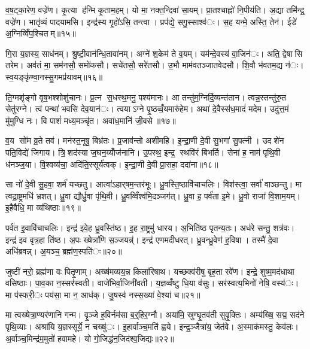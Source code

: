 व॒ष॒ट्का॒रेण॒ वज्रे॑ण। कृ॒त्या ह॑न्मि कृ॒ताम॒हम्। यो मा॒ नक्त॒न्दिवा॑ सा॒यम्। प्रा॒तश्चाह्नो॑ नि॒पीय॑ति। अ॒द्या तमि॑न्द्र॒ वज्रे॑ण। भातृ॑व्यं पादयामसि। इन्द्र॑स्य गृ॒हो॑ऽसि॒ तन्त्वा। प्रप॑द्ये॒ सगु॒स्साश्व॑ः। स॒ह यन्मे॒ अस्ति॒ तेन॑। ईडे॑ अ॒ग्निव्विँ॑प॒श्चितम्॥१५॥

गि॒रा य॒ज्ञस्य॒ साध॑नम्। श्रु॒ष्टी॒वान॑न्धि॒तावा॑नम्। अग्ने॑ श॒केम॑ ते व॒यम्। यम॑न्दे॒वस्य॑ वा॒जिन॑ः। अति॒ द्वेषासि तरेम। अव॑तं मा॒ सम॑नसौ॒ समो॑कसौ। सचे॑तसौ॒ सरे॑तसौ। उ॒भौ माम॑वतञ्जातवेदसौ। शि॒वौ भ॑वतम॒द्य न॑ः। स्व॒यङ्कृ॑ण्वा॒नस्सु॒गमप्र॑यावम्॥१६॥

ति॒ग्मशृ॑ङ्गो वृष॒भश्शोशु॑चानः। प्र॒त्न स॒धस्थ॒मनु॒ पश्य॑मानः। आ तन्तु॑म॒ग्निर्दि॒व्यन्त॑तान। त्वन्न॒स्तन्तु॑रु॒त सेतु॑रग्ने। त्वं पन्था॑ भवसि देव॒यान॑ः। त्वयाऽग्ने पृ॒ष्ठव्वँ॒यमारु॑हेम। अथा॑ दे॒वैस्स॑ध॒मादं॑ मदेम। उदु॑त्त॒मं मु॑मुग्धि नः। वि पाशं॑ मध्य॒मञ्चृ॑त। अवा॑ध॒मानि॑ जी॒वसे॥१७॥

व॒य सो॑म व्र॒ते तव॑। मन॑स्त॒नूषु॒ बिभ्र॑तः। प्र॒जाव॑न्तो अशीमहि। इ॒न्द्रा॒णी दे॒वी सु॒भगा॑ सु॒पत्नी। उदशे॑न पति॒विद्ये॑ जिगाय। त्रि॒शद॑स्या ज॒घन॒य्योँज॑नानि। उ॒पस्थ॒ इन्द्र॒ स्थवि॑रं बिभर्ति। सेना॑ ह॒ नाम॑ पृथि॒वी ध॑नञ्ज॒या। वि॒श्वव्य॑चा॒ अदि॑ति॒स्सूर्य॑त्वक्। इ॒न्द्रा॒णी दे॒वी प्रा॒सहा॒ ददा॑ना॥१८॥

सा नो॑ दे॒वी सु॒हवा॒ शर्म॑ यच्छतु। आत्वा॑ऽहार्‌षम॒न्तर॑भूः। ध्रु॒वस्ति॒ष्ठावि॑चाचलिः। विश॑स्त्वा॒ सर्वा॑ वाञ्छन्तु। मा त्वद्रा॒ष्ट्रमधि॑ भ्रशत्। ध्रु॒वा द्यौर्ध्रु॒वा पृ॑थि॒वी। ध्रु॒वव्विँश्व॑मि॒दञ्जग॑त्। ध्रु॒वा ह॒ पर्व॑ता इ॒मे। ध्रु॒वो राजा॑ वि॒शाम॒यम्। इ॒हैवैधि॒ मा व्य॑थिष्ठाः॥१९॥

पर्व॑त इ॒वावि॑चाचलिः। इन्द्र॑ इवे॒ह ध्रु॒वस्ति॑ष्ठ। इ॒ह रा॒ष्ट्रमु॑ धारय। अ॒भिति॑ष्ठ पृतन्य॒तः। अध॑रे सन्तु॒ शत्र॑वः। इन्द्र॑ इव वृत्र॒हा ति॑ष्ठ। अ॒पः ख्षेत्रा॑णि स॒ञ्जयन्न्॑। इन्द्र॑ एणमदीधरत्। ध्रु॒वन्ध्रु॒वेण॑ ह॒विषा। तस्मै॑ दे॒वा अधि॑ब्रवन्न्। अ॒यञ्च॒ ब्रह्म॑ण॒स्पति॑ः॥२०॥


जुष्टी॑ नरो॒ ब्रह्म॑णा वः पितृ॒णाम्। अख्ष॑मव्यय॒न्न किला॑रिषाथ। यच्छक्व॑रीषु बृह॒ता रवे॑ण। इन्द्रे॒ शुष्म॒मद॑धाथा वसिष्ठाः। पा॒व॒का न॒स्सर॑स्वती। वाजे॑भिर्वा॒जिनी॑वती। य॒ज्ञव्वँ॑ष्टु धि॒या व॑सुः। सर॑स्वत्य॒भिनो॑ नेषि॒ वस्य॑ः। मा प॑स्फरी॒ः पय॑सा॒ मा न॒ आध॑क्। जु॒षस्व॑ नस्स॒ख्या॑ वे॒श्या॑ च॥२१॥

मा त्वख्षेत्रा॒ण्यर॑णानि गन्म। वृ॒ञ्जे ह॒विर्नम॑सा ब॒र्॒हिर॒ग्नौ। अया॑मि॒ स्रुग्घृ॒तव॑ती सुवृ॒क्तिः। अम्य॑ख्षि॒ सद्म॒ सद॑ने पृथि॒व्याः। अश्रा॑यि य॒ज्ञस्सूर्ये॒ न चख्षु॑ः। इ॒हार्वाञ्च॒मति॑ ह्वये। इन्द्र॒ञ्जैत्रा॑य॒ जेत॑वे। अ॒स्माक॑मस्तु॒ केव॑लः। अ॒र्वाञ्च॒मिन्द्र॑म॒मुतो॑ हवामहे। यो गो॒जिद्ध॑न॒जिद॑श्व॒जिद्यः॥२२॥

